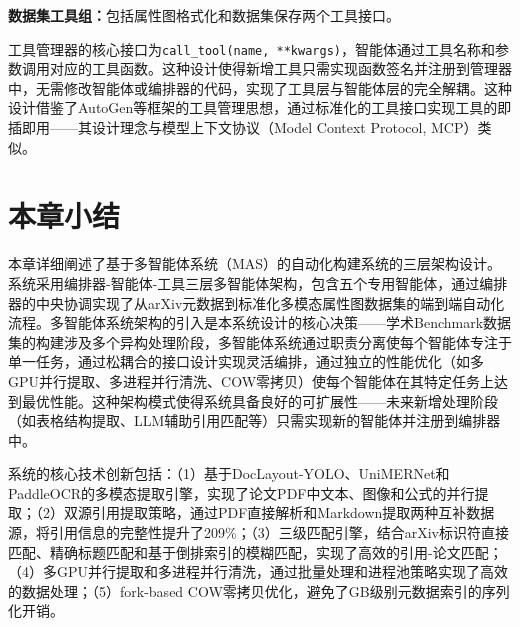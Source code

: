 \textbf{数据集工具组：}包括属性图格式化和数据集保存两个工具接口。

工具管理器的核心接口为\texttt{call\_tool(name, **kwargs)}，智能体通过工具名称和参数调用对应的工具函数。这种设计使得新增工具只需实现函数签名并注册到管理器中，无需修改智能体或编排器的代码，实现了工具层与智能体层的完全解耦。这种设计借鉴了AutoGen\cite{wu2023autogen}等框架的工具管理思想，通过标准化的工具接口实现工具的即插即用——其设计理念与模型上下文协议（Model Context Protocol, MCP）类似。

\section{本章小结}

本章详细阐述了基于多智能体系统（MAS）的自动化构建系统的三层架构设计。系统采用编排器-智能体-工具三层多智能体架构，包含五个专用智能体，通过编排器的中央协调实现了从arXiv元数据到标准化多模态属性图数据集的端到端自动化流程。多智能体系统架构的引入是本系统设计的核心决策——学术Benchmark数据集的构建涉及多个异构处理阶段，多智能体系统通过职责分离使每个智能体专注于单一任务，通过松耦合的接口设计实现灵活编排，通过独立的性能优化（如多GPU并行提取、多进程并行清洗、COW零拷贝）使每个智能体在其特定任务上达到最优性能。这种架构模式使得系统具备良好的可扩展性——未来新增处理阶段（如表格结构提取、LLM辅助引用匹配等）只需实现新的智能体并注册到编排器中。

系统的核心技术创新包括：（1）基于DocLayout-YOLO、UniMERNet和PaddleOCR的多模态提取引擎，实现了论文PDF中文本、图像和公式的并行提取；（2）双源引用提取策略，通过PDF直接解析和Markdown提取两种互补数据源，将引用信息的完整性提升了209\%；（3）三级匹配引擎，结合arXiv标识符直接匹配、精确标题匹配和基于倒排索引的模糊匹配，实现了高效的引用-论文匹配；（4）多GPU并行提取和多进程并行清洗，通过批量处理和进程池策略实现了高效的数据处理；（5）fork-based COW零拷贝优化，避免了GB级别元数据索引的序列化开销。
